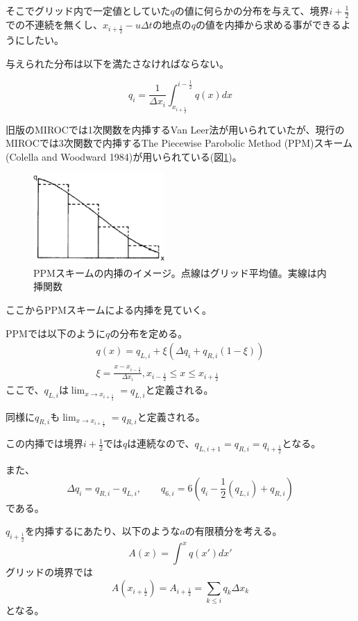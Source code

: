 \documentclass{jsbook}
\begin{document}
そこでグリッド内で一定値としていた$q$の値に何らかの分布を与えて、境界$i+\frac{1}{2}$での不連続を無くし、$x_{i+\frac{1}{2}}-u\Delta t$の地点の$q$の値を内挿から求める事ができるようにしたい。

与えられた分布は以下を満たさなければならない。

\begin{equation}
  q_{i}=\frac{1}{\Delta x_{i}} \int_{x_{i+\frac{1}{2}}}^{i-\frac{1}{2}} q(x) dx
\end{equation}

旧版のMIROCでは1次関数を内挿するVan Leer法が用いられていたが、現行のMIROCでは3次関数で内挿するThe Piecewise Parobolic Method (PPM)スキーム(Colella and Woodward 1984)が用いられている(図\ref{f1})。

\begin{figure}
  \centering
  \includegraphics[width=5cm]{ppm_interpolate.png}
  \caption{PPMスキームの内挿のイメージ。点線はグリッド平均値。実線は内挿関数}
    \label{f1}
\end{figure}
ここからPPMスキームによる内挿を見ていく。

PPMでは以下のように$q$の分布を定める。
\begin{equation}
\begin{split}
\label{a4}
  q(x)=q_{L,i}+\xi (\Delta q_{i}+q_{R,i}(1-\xi))\\
  \xi=\frac{x-x_{i-\frac{1}{2}}}{\Delta x_{i}},  x_{i-\frac{1}{2}}\leq x \leq x_{i+\frac{1}{2}}
  \end{split}
\end{equation}
ここで、$q_{L,i}$は$\lim_{x \to x_{i+\frac{1}{2}}}=q_{L,i}$と定義される。

同様に$q_{R,i}$も$\lim_{x \to x_{i+\frac{1}{2}}}=q_{R,i}$と定義される。

この内挿では境界$i+\frac{1}{2}$では$q$は連続なので、$q_{L,i+1}=q_{R,i}=q_{i+\frac{1}{2}}$となる。

また、
\begin{equation}
  \Delta q_{i}=q_{R,i}-q_{L,i},\qquad q_{6,i}=6(q_{i}-\frac{1}{2}(q_{L,i})+q_{R,i})
\end{equation}
である。

$q_{i+\frac{1}{2}}$を内挿するにあたり、以下のような$a$の有限積分を考える。
\begin{equation}
  A(x)= \int^{x} q(x') dx'
\end{equation}
グリッドの境界では
\begin{equation}
A(x_{i+\frac{1}{2}})=A_{i+\frac{1}{2}}=\sum_{k\leq i}q_{k}\Delta x_{k}  
\end{equation}
となる。
\end{document}
